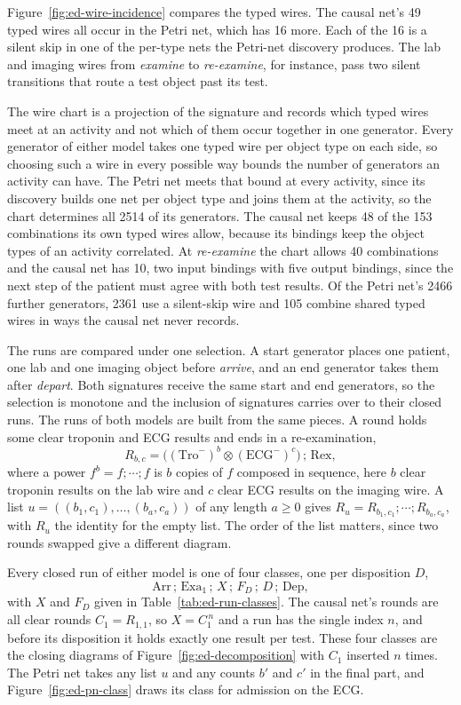 Figure~\ref{fig:ed-wire-incidence} compares the typed wires. The causal net's 49 typed wires all
occur in the Petri net, which has 16 more. Each of the 16 is a silent skip in one of the per-type nets
the Petri-net discovery produces. The lab and imaging wires from \emph{examine} to
\emph{re-examine}, for instance, pass two silent transitions that route a test object past its test.

The wire chart is a projection of the signature and records which typed wires meet at an activity
and not which of them occur together in one generator. Every generator of either model takes one
typed wire per object type on each side, so choosing such a wire in every possible way bounds the
number of generators an activity can have. The Petri net meets
that bound at every activity, since its discovery builds one net per object type and joins them at
the activity, so the chart determines all 2514 of its generators. The causal net keeps 48 of the 153
combinations its own typed wires allow, because its bindings keep the object types of an activity
correlated. At \emph{re-examine} the chart allows 40 combinations and the causal net has 10, two input
bindings with five output bindings, since the next step of the patient must agree with both test
results. Of the Petri net's 2466 further generators, 2361 use a silent-skip wire and 105 combine
shared typed wires in ways the causal net never records.

The runs are compared under one selection. A start generator places one patient, one lab and one
imaging object before \emph{arrive}, and an end generator takes them after \emph{depart}. Both
signatures receive the same start and end generators, so the selection is monotone and the
inclusion of signatures carries over to their closed runs. The runs of both models are built from
the same pieces. A round holds some clear troponin and ECG results and ends in a re-examination,
\[
  R_{b,c}=\bigl((\mathrm{Tro}^{-})^{b}\otimes(\mathrm{ECG}^{-})^{c}\bigr)\,;\,\mathrm{Rex},
\]
where a power $f^{b}=f;\cdots;f$ is $b$ copies of $f$ composed in sequence, here $b$ clear troponin
results on the lab wire and $c$ clear ECG results on the imaging wire. A list $u=((b_1,c_1),\dots,(b_a,c_a))$ of any length $a\geq0$ gives
$R_u=R_{b_1,c_1};\cdots;R_{b_a,c_a}$, with $R_u$ the identity for the empty list. The order of the
list matters, since two rounds swapped give a different diagram.

Every closed run of either model is one of four classes, one per disposition $D$,
\[
  \mathrm{Arr}\,;\,\mathrm{Exa}_1\,;\,X\,;\,F_D\,;\,D\,;\,\mathrm{Dep},
\]
with $X$ and $F_D$ given in Table~\ref{tab:ed-run-classes}. The causal net's rounds are all clear
rounds $C_1=R_{1,1}$, so $X=C_1^{\,n}$ and a run has the single index $n$, and before its disposition
it holds exactly one result per test. These four classes are the closing diagrams of
Figure~\ref{fig:ed-decomposition} with $C_1$ inserted $n$ times. The Petri net takes any list $u$ and
any counts $b'$ and $c'$ in the final part, and Figure~\ref{fig:ed-pn-class} draws its class for
admission on the ECG.


